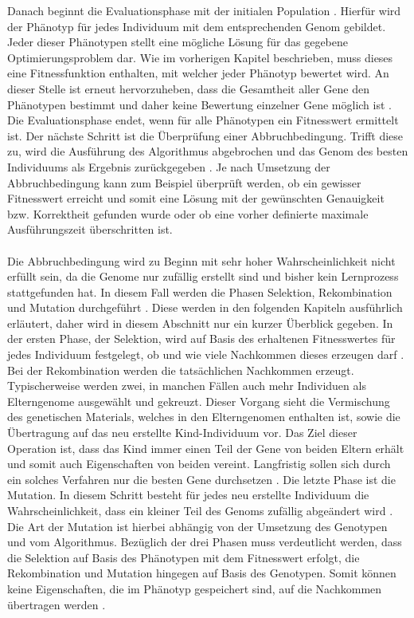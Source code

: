 Danach beginnt die Evaluationsphase mit der initialen Population \cite{rothlauf2006representation}. Hierfür wird der Phänotyp für jedes Individuum mit dem entsprechenden Genom gebildet. Jeder dieser Phänotypen stellt eine mögliche Lösung für das gegebene Optimierungsproblem dar. Wie im vorherigen Kapitel beschrieben, muss dieses eine Fitnessfunktion enthalten, mit welcher jeder Phänotyp bewertet wird. An dieser Stelle ist erneut hervorzuheben, dass die Gesamtheit aller Gene den Phänotypen bestimmt und daher keine Bewertung einzelner Gene möglich ist \cite{rothlauf2006representation}. Die Evaluationsphase endet, wenn für alle Phänotypen ein Fitnesswert ermittelt ist. Der nächste Schritt ist die Überprüfung einer Abbruchbedingung. Trifft diese zu, wird die Ausführung des Algorithmus abgebrochen und das Genom des besten Individuums als Ergebnis zurückgegeben \cite{weicker2015evolutionare}. Je nach Umsetzung der Abbruchbedingung kann zum Beispiel überprüft werden, ob ein gewisser Fitnesswert erreicht und somit eine Lösung mit der gewünschten Genauigkeit bzw. Korrektheit gefunden wurde oder ob eine vorher definierte maximale Ausführungszeit überschritten ist.
\\\\
Die Abbruchbedingung wird zu Beginn mit sehr hoher Wahrscheinlichkeit nicht erfüllt sein, da die Genome nur zufällig erstellt sind und bisher kein Lernprozess stattgefunden hat. In diesem Fall werden die Phasen Selektion, Rekombination und Mutation durchgeführt \cite{rothlauf2006representation}. Diese werden in den folgenden Kapiteln ausführlich erläutert, daher wird in diesem Abschnitt nur ein kurzer Überblick gegeben. In der ersten Phase, der Selektion, wird auf Basis des erhaltenen Fitnesswertes für jedes Individuum festgelegt, ob und wie viele Nachkommen dieses erzeugen darf \cite{weicker2015evolutionare}. Bei der Rekombination werden die tatsächlichen Nachkommen erzeugt. Typischerweise werden zwei, in manchen Fällen auch mehr Individuen als Elterngenome ausgewählt und gekreuzt. Dieser Vorgang sieht die Vermischung des genetischen Materials, welches in den Elterngenomen enthalten ist, sowie die Übertragung auf das neu erstellte Kind-Individuum vor. Das Ziel dieser Operation ist, dass das Kind immer einen Teil der Gene von beiden Eltern erhält und somit auch Eigenschaften von beiden vereint. Langfristig sollen sich durch ein solches Verfahren nur die besten Gene durchsetzen \cite{weicker2015evolutionare}. 
Die letzte Phase ist die Mutation. In diesem Schritt besteht für jedes neu erstellte Individuum die Wahrscheinlichkeit, dass ein kleiner Teil des Genoms zufällig abgeändert wird \cite{rojas1996neural}. Die Art der Mutation ist hierbei abhängig von der Umsetzung des Genotypen und vom Algorithmus. Bezüglich der drei Phasen muss verdeutlicht werden, dass die Selektion auf Basis des Phänotypen mit dem Fitnesswert erfolgt, die Rekombination und Mutation hingegen auf Basis des Genotypen. Somit können keine Eigenschaften, die im Phänotyp gespeichert sind, auf die Nachkommen übertragen werden \cite{rothlauf2006representation}.
